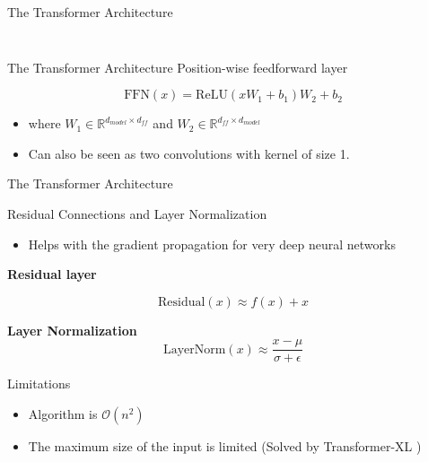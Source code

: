 \documentclass[aspectratio=169]{beamer}
\begin{document}
\begin{frame}{The Transformer Architecture}
\begin{columns}
\begin{column}{0.5\textwidth}
\begin{center}
\begin{figure}
\begin{overprint}
    \end{overprint}
    \end{figure}
    \end{center}
\end{column}
\end{columns}
\end{frame}

\begin{frame}{The Transformer Architecture}
\centering
Position-wise feedforward layer
\vspace{.2cm}

$$
\mathrm{FFN}(x) = \mathrm{ReLU}(xW_1 + b_1)W_2 + b_2
$$

\begin{itemize}
	\item where $W_1 \in \mathbb{R}^{d_{model} \times d_{ff}}$ and $W_2 \in \mathbb{R}^{d_{ff} \times d_{model}}$
	\item Can also be seen as two convolutions with kernel of size 1.
\end{itemize}

\end{frame}

\begin{frame}{The Transformer Architecture}

\centering
Residual Connections and Layer Normalization
\vspace{.2cm}

\raggedright

\begin{itemize}
	\item Helps with the gradient propagation for very deep neural networks \cite{he2016deep, ba2016layer}
\end{itemize}
\vspace{.2cm}

\textbf{Residual layer}

$$
\mathrm{Residual}(x) \approx f(x) + x
$$

\textbf{Layer Normalization} 
$$
\mathrm{LayerNorm}(x) \approx \frac{x - \mu}{\sigma + \epsilon}
$$ 

\end{frame}

\begin{frame}{Limitations}
\begin{itemize}
	\item Algorithm is $\mathcal{O}(n^2)$
	\item The maximum size of the input is limited (Solved by Transformer-XL \cite{dai2019transformer})
\end{itemize}
\end{frame}
\end{document}
